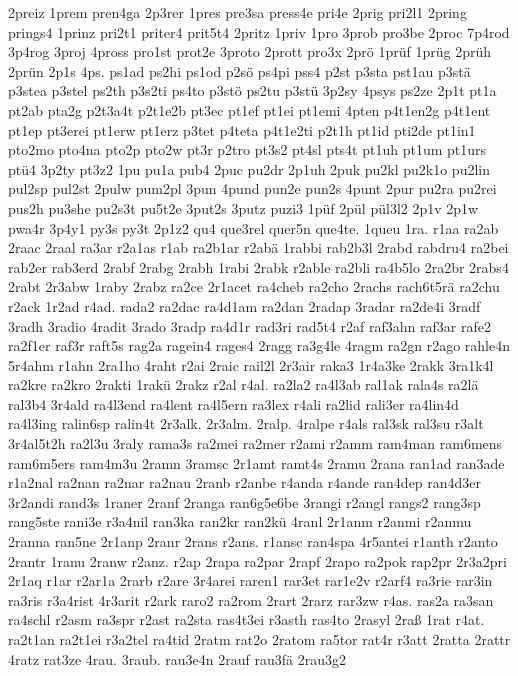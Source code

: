{2preiz
1prem
pren4ga
2p3rer
1pres
pre3sa
press4e
pri4e
2prig
pri2l1
2pring
prings4
1prinz
pri2t1
priter4
prit5t4
2pritz
1priv
1pro
3prob
pro3be
2proc
7p4rod
3p4rog
3proj
4pross
pro1st
prot2e
3proto
2prott
pro3x
2prö
1prüf
1prüg
2prüh
2prün
2p1s
4ps.
ps1ad
ps2hi
ps1od
p2sö
ps4pi
pss4
p2st
p3sta
pst1au
p3stä
p3stea
p3stel
ps2th
p3s2ti
ps4to
p3stö
ps2tu
p3stü
3p2sy
4psys
ps2ze
2p1t
pt1a
pt2ab
pta2g
p2t3a4t
p2t1e2b
pt3ec
pt1ef
pt1ei
pt1emi
4pten
p4t1en2g
p4t1ent
pt1ep
pt3erei
pt1erw
pt1erz
p3tet
p4teta
p4t1e2ti
p2t1h
pt1id
pti2de
pt1in1
pto2mo
pto4na
pto2p
pto2w
pt3r
p2tro
pt3s2
pt4sl
pts4t
pt1uh
pt1um
pt1urs
ptü4
3p2ty
pt3z2
1pu
pu1a
pub4
2puc
pu2dr
2p1uh
2puk
pu2kl
pu2k1o
pu2lin
pul2sp
pul2st
2pulw
pum2pl
3pun
4pund
pun2e
pun2s
4punt
2pur
pu2ra
pu2rei
pus2h
pu3she
pu2s3t
pu5t2e
3put2s
3putz
puzi3
1püf
2pül
pül3l2
2p1v
2p1w
pwa4r
3p4y1
py3s
py3t
2p1z2
qu4
que3rel
quer5n
que4te.
1queu
1ra.
r1aa
ra2ab
2raac
2raal
ra3ar
r2a1as
r1ab
ra2b1ar
r2abä
1rabbi
rab2b3l
2rabd
rabdru4
ra2bei
rab2er
rab3erd
2rabf
2rabg
2rabh
1rabi
2rabk
r2able
ra2bli
ra4b5lo
2ra2br
2rabs4
2rabt
2r3abw
1raby
2rabz
ra2ce
2r1acet
ra4cheb
ra2cho
2rachs
rach6t5rä
ra2chu
r2ack
1r2ad
r4ad.
rada2
ra2dac
ra4d1am
ra2dan
2radap
3radar
ra2de4i
3radf
3radh
3radio
4radit
3rado
3radp
ra4d1r
rad3ri
rad5t4
r2af
raf3ahn
raf3ar
rafe2
ra2f1er
raf3r
raft5s
rag2a
ragein4
rages4
2ragg
ra3g4le
4ragm
ra2gn
r2ago
rahle4n
5r4ahm
r1ahn
2ra1ho
4raht
r2ai
2raic
rail2l
2r3air
raka3
1r4a3ke
2rakk
3ra1k4l
ra2kre
ra2kro
2rakti
1rakü
2rakz
r2al
r4al.
ra2la2
ra4l3ab
ral1ak
rala4s
ra2lä
ral3b4
3r4ald
ra4l3end
ra4lent
ra4l5ern
ra3lex
r4ali
ra2lid
rali3er
ra4lin4d
ra4l3ing
ralin6sp
ralin4t
2r3alk.
2r3alm.
2ralp.
4ralpe
r4als
ral3sk
ral3su
r3alt
3r4al5t2h
ra2l3u
3raly
rama3s
ra2mei
ra2mer
r2ami
r2amm
ram4man
ram6mens
ram6m5ers
ram4m3u
2ramn
3ramsc
2r1amt
ramt4s
2ramu
2rana
ran1ad
ran3ade
r1a2nal
ra2nan
ra2nar
ra2nau
2ranb
r2anbe
r4anda
r4ande
ran4dep
ran4d3er
3r2andi
rand3s
1raner
2ranf
2ranga
ran6g5e6be
3rangi
r2angl
rangs2
rang3sp
rang5ste
rani3e
r3a4nil
ran3ka
ran2kr
ran2kü
4ranl
2r1anm
r2anmi
r2anmu
2ranna
ran5ne
2r1anp
2ranr
2rans
r2ans.
r1ansc
ran4spa
4r5antei
r1anth
r2anto
2rantr
1ranu
2ranw
r2anz.
r2ap
2rapa
ra2par
2rapf
2rapo
ra2pok
rap2pr
2r3a2pri
2r1aq
r1ar
r2ar1a
2rarb
r2are
3r4arei
raren1
rar3et
rar1e2v
r2arf4
ra3rie
rar3in
ra3ris
r3a4rist
4r3arit
r2ark
raro2
ra2rom
2rart
2rarz
rar3zw
r4as.
ras2a
ra3san
ra4schl
r2asm
ra3spr
r2ast
ra2sta
ras4t3ei
r3asth
ras4to
2rasyl
2raß
1rat
r4at.
ra2t1an
ra2t1ei
r3a2tel
ra4tid
2ratm
rat2o
2ratom
ra5tor
rat4r
r3att
2ratta
2rattr
4ratz
rat3ze
4rau.
3raub.
rau3e4n
2rauf
rau3fä
2rau3g2
}
